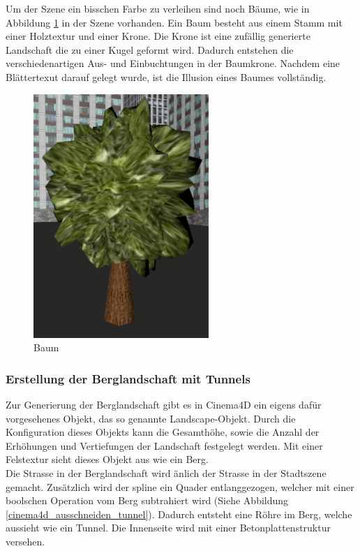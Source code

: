 Um der Szene ein bisschen Farbe zu verleihen sind noch Bäume, wie in Abbildung \ref{screenshot_tree} in der Szene vorhanden. Ein Baum besteht aus einem Stamm mit einer Holztextur und einer Krone. Die Krone ist eine zufällig generierte Landschaft die zu einer Kugel geformt wird. Dadurch entstehen die verschiedenartigen Aus- und Einbuchtungen in der Baumkrone. Nachdem eine Blättertexut darauf gelegt wurde, ist die Illusion eines Baumes vollständig.\\

\begin{figure}[H]
\centering 
\includegraphics[scale=0.4]{src/screenshot_tree.png}
\caption{Baum} %
\label{screenshot_tree} %
\end{figure}

\subsubsection{Erstellung der Berglandschaft mit Tunnels}
Zur Generierung der Berglandschaft gibt es in Cinema4D ein eigens dafür vorgesehenes Objekt, das so genannte Landscape-Objekt. Durch die Konfiguration dieses Objekts kann die Gesamthöhe, sowie die Anzahl der Erhöhungen und Vertiefungen der Landschaft festgelegt werden. Mit einer Felstextur sieht dieses Objekt aus wie ein Berg.\\
Die Strasse in der Berglandschaft wird änlich der Strasse in der Stadtszene gemacht. Zusätzlich wird der \gls{spline} ein Quader entlanggezogen, welcher mit einer boolschen Operation vom Berg subtrahiert wird (Siehe Abbildung \ref{cinema4d_ausschneiden_tunnel}). Dadurch entsteht eine Röhre im Berg, welche aussieht wie ein Tunnel. Die Innenseite wird mit einer Betonplattenstruktur versehen.

